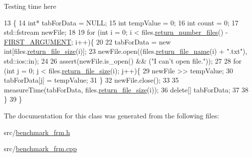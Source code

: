 Testing time here 
\begin{DoxyCode}
13                                     \{
14     \textcolor{keywordtype}{int}* tabForData = NULL;
15     \textcolor{keywordtype}{int} tempValue = 0;
16     \textcolor{keywordtype}{int} count = 0;
17     std::fstream newFile;
18 
19     \textcolor{keywordflow}{for} (\textcolor{keywordtype}{int} i = 0; i < files.\hyperlink{class_input_files_a5b1547e90d17d2332daed2203939ce25}{return\_number\_files}() - 
      \hyperlink{inputfile__txt_8h_ac6795aca310766e1b10d90013aac6d47}{FIRST\_ARGUMENT}; i++)\{
20         
22         tabForData = \textcolor{keyword}{new} \textcolor{keywordtype}{int}[files.\hyperlink{class_input_files_ad0bb8456352c7e008315a284d9003086}{return\_file\_size}(i)];
23         newFile.open((files.\hyperlink{class_input_files_a9867703917e916ceea50b9d7d4b07d2f}{return\_file\_name}(i) + \textcolor{stringliteral}{".txt"}), std::ios::in);
24         
26         assert(newFile.is\_open() && (\textcolor{stringliteral}{"I can't open file."}));
27 
28         \textcolor{keywordflow}{for} (\textcolor{keywordtype}{int} j = 0; j < files.\hyperlink{class_input_files_ad0bb8456352c7e008315a284d9003086}{return\_file\_size}(i); j++)\{
29             newFile >> tempValue;
30             tabForData[j] = tempValue;
31         \}
32         newFile.close();
33 
35         measureTime(tabForData, files.\hyperlink{class_input_files_ad0bb8456352c7e008315a284d9003086}{return\_file\_size}(i));
36         \textcolor{keyword}{delete}[] tabForData;
37         
38     \}
39 \}
\end{DoxyCode}


The documentation for this class was generated from the following files\+:\begin{DoxyCompactItemize}
\item 
src/\hyperlink{benchmark__frm_8h}{benchmark\+\_\+frm.\+h}\item 
src/\hyperlink{benchmark__frm_8cpp}{benchmark\+\_\+frm.\+cpp}\end{DoxyCompactItemize}
